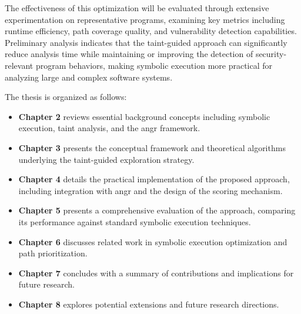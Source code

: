 
The effectiveness of this optimization will be evaluated through extensive experimentation on representative programs, examining key metrics including runtime efficiency, path coverage quality, and vulnerability detection capabilities. Preliminary analysis indicates that the taint-guided approach can significantly reduce analysis time while maintaining or improving the detection of security-relevant program behaviors, making symbolic execution more practical for analyzing large and complex software systems.

The thesis is organized as follows:

\begin{itemize}
    \item \textbf{Chapter 2} reviews essential background concepts including symbolic execution, taint analysis, and the angr framework.
    \item \textbf{Chapter 3} presents the conceptual framework and theoretical algorithms underlying the taint-guided exploration strategy.
    \item \textbf{Chapter 4} details the practical implementation of the proposed approach, including integration with angr and the design of the scoring mechanism.
    \item \textbf{Chapter 5} presents a comprehensive evaluation of the approach, comparing its performance against standard symbolic execution techniques.
    \item \textbf{Chapter 6} discusses related work in symbolic execution optimization and path prioritization.
    \item \textbf{Chapter 7} concludes with a summary of contributions and implications for future research.
    \item \textbf{Chapter 8} explores potential extensions and future research directions.
\end{itemize}
